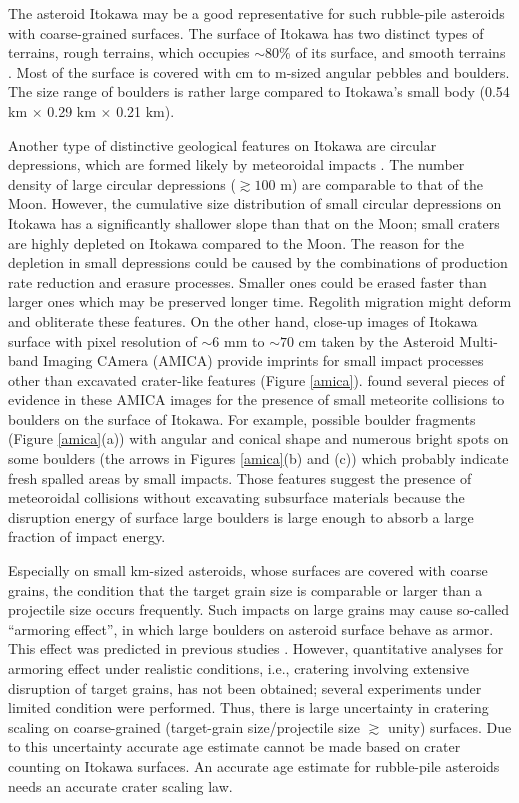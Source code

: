 \documentclass[3p,authoryear]{elsarticle}
\begin{document}
The asteroid Itokawa may be a good representative for such rubble-pile asteroids with coarse-grained surfaces.
The surface of Itokawa has two distinct types of terrains, rough terrains, which occupies $\sim 80\%$ of its surface, and smooth terrains \citep{saito2006}.
Most of the surface is covered with cm to m-sized angular pebbles and boulders. The size range of boulders is rather large compared to Itokawa's small body (0.54 km $\times$ 0.29 km $\times$ 0.21 km).

Another type of distinctive geological features on Itokawa are circular depressions, which are formed likely by meteoroidal impacts \citep{hirata2009}.
The number density of large circular depressions ($\gtrsim 100$ m) are comparable to that of the Moon.
However, the cumulative size distribution of small circular depressions on Itokawa has a significantly shallower slope than that on the Moon;
small craters are highly depleted on Itokawa compared to the Moon.
The reason for the depletion in small depressions could be caused by the combinations of production rate reduction and erasure processes.
Smaller ones could be erased faster than larger ones which may be preserved longer time. Regolith migration \citep{miyamoto2007, tancredi2015}
might deform and obliterate these features.
On the other hand, close-up images of Itokawa surface with pixel resolution of $\sim 6$ mm to $\sim70$ cm taken by the Asteroid Multi-band Imaging
CAmera (AMICA) provide imprints for small impact processes other than excavated crater-like features (Figure \ref{amica}). \citet{nakamura2008} found
several pieces of evidence in these AMICA images for the presence of small meteorite collisions to boulders on the surface of Itokawa.
For example, possible boulder fragments (Figure \ref{amica}(a)) with angular and conical shape and numerous bright spots  on some boulders (the arrows in Figures \ref{amica}(b) and (c)) which probably indicate fresh spalled areas by small impacts.
Those features suggest the presence of meteoroidal collisions without excavating subsurface materials because the disruption energy of surface large boulders is large enough to absorb a large fraction of impact energy.

Especially on small km-sized asteroids, whose surfaces are covered with coarse grains, the condition that the target grain size is comparable or larger than a projectile size occurs frequently. Such impacts on large grains may cause so-called ``armoring effect'', in which large boulders on asteroid surface behave as armor.
This effect was predicted in previous studies \citep[e.g.,][]{barnouin2005, guettler2012}.
However, quantitative analyses for armoring effect under realistic conditions, i.e., cratering involving extensive disruption of target grains, has not been obtained; several experiments under limited condition were performed.
Thus, there is large uncertainty in cratering scaling on coarse-grained (target-grain size/projectile size $\gtrsim $ unity) surfaces. Due to this uncertainty accurate age estimate cannot be made based on crater counting on Itokawa surfaces. An accurate age estimate for rubble-pile asteroids needs an accurate crater scaling law.
\end{document}
